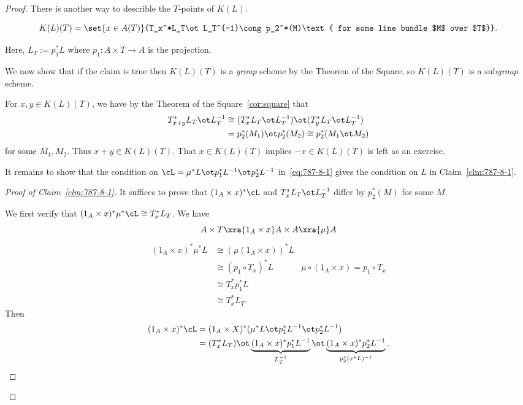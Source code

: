 \begin{proof}
There is another way to describle the $T$-points of $K(L)$. 
\begin{clm}
\[
K(L)(T)=\set{x\in A(T)}{T_x^*L_T\ot L_T^{-1}\cong p_2^*(M)\text{ for some line bundle $M$ over $T$}}.
\]
\end{clm}
Here, $L_T:=p_1^*L$ where $p_1:A\times T\to A$ is the projection.


We now show that if the claim is true then $K(L)(T)$ is a {\it group} scheme by the Theorem of the Square, so $K(L)(T)$ is a sub{\it group} scheme.

For $x,y\in K(L)(T)$, we have by the Theorem of the Square~\ref{cor:square} that
\begin{align*}
T_{x+y}^*L_T\ot L_T^{-1} &\cong (T_x^*L_T\ot L_T^{-1})
\ot 
(T_y^* L_T\ot L_T^{-1})\\
&=p_2^*(M_1)\ot p_2^*(M_2)\cong p_2^*(M_1\ot M_2)
\end{align*}
for some $M_1,M_2$.
Thus $x+y\in K(L)(T)$. That $x\in K(L)(T)$ implies $-x\in K(L)(T)$ is left as an exercise.

It remains to show that the condition on $\cL=\mu^*L\ot p_1^*L^{-1}\ot p_2^* L^{-1}$ in~\ref{eq:787-8-1} gives the condition on $L$ in Claim~\ref{clm:787-8-1}.
\begin{proof}[Proof of Claim~\ref{clm:787-8-1}]
It suffices to prove that $(1_A\times x)^*\cL$ and $T_x^* L_T\ot L_T^{-1}$ differ by $p_2^*(M)$ for some $M$. 

We first verify that $(1_A\times x)^*\mu^*\cL\cong T_x^*L_T$. We have
\[
A\times T\xra{1_A\times x}A\times A\xra{\mu}A
\]
\begin{align*}
(1_A\times x)^* \mu^*L &\cong (\mu(1_A\times x))^* L\\
&\cong (p_1\circ T_x)^*L&\mu\circ (1_A\times x)=p_1\circ T_x\\
&\cong T_x^*p_1^* L\\
&\cong T_x^* L_T.
\end{align*}
Then
\begin{align*}
(1_A\times x)^* \cL&=(1_A\times X)^* (\mu^*L\ot p_1^*L^{-1}\ot p_2^* L^{-1})\\
&=(T_x^*L_T)\ot \underbrace{(1_A\times x)^*p_1^*L^{-1}}_{L_T^{-1}} \ot \underbrace{(1_A\times x)^*p_2^*L^{-1}}_{p_2^*(x^*L)^{-1}}.
\end{align*}
\end{proof}
\end{proof}
